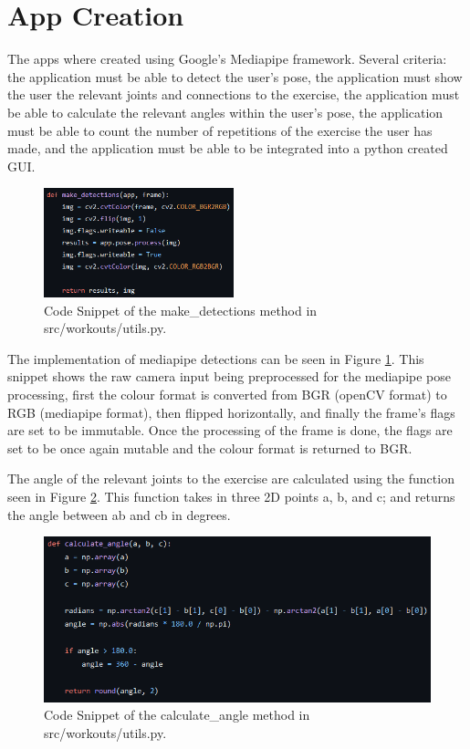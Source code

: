 \section{App Creation}
    The apps where created using Google's Mediapipe framework. Several criteria: the application must be able to detect the user's pose, the application must show the user the relevant joints and connections to the exercise, the application must be able to calculate the relevant angles within the user's pose, the application must be able to count the number of repetitions of the exercise the user has made, and the application must be able to be integrated into a python created GUI. \\

    \begin{figure}[htbp]
            \centering
            \includegraphics[width=0.49\textwidth]{figures/make_detections.png}
            \caption{Code Snippet of the make\_detections method in src/workouts/utils.py.}
            \label{fig:make_detections}
    \end{figure}
    
    The implementation of mediapipe detections can be seen in Figure \ref{fig:make_detections}. This snippet shows the raw camera input being preprocessed for the mediapipe pose processing, first the colour format is converted from BGR (openCV format) to RGB (mediapipe format), then flipped horizontally, and finally the frame's flags are set to be immutable. Once the processing of the frame is done, the flags are set to be once again mutable and the colour format is returned to BGR.

    The angle of the relevant joints to the exercise are calculated using the function seen in Figure \ref{fig:calculate_angle}. This function takes in three 2D points a, b, and c; and returns the angle between ab and cb in degrees.

    \begin{figure}[htbp]
            \centering
            \includegraphics[width=1.00\textwidth]{figures/calculate_angle.png}
            \caption{Code Snippet of the calculate\_angle method in src/workouts/utils.py.}
            \label{fig:calculate_angle}
    \end{figure}

